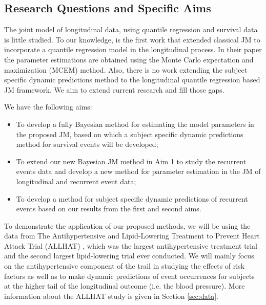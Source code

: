 \subsection{Research Questions and Specific Aims}\label{sec:aims}
The joint model of longitudinal data, using quantile regression and survival data is little studied. To our knowledge, \cite{Alessio2014qrjm} is the first work that extended classical JM to incorporate a quantile regression model in the longitudinal process. In their paper the parameter estimations are obtained using the Monte Carlo expectation and maximization (MCEM) method.  Also, there is no work extending the subject specific dynamic predictions method to the longitudinal quantile regression based JM framework. We aim to extend current research and fill those gaps.\par

We have the following aims:

\begin{itemize}
\item To develop a fully Bayesian method for estimating the model parameters in the proposed JM, based on which a subject specific dynamic predictions method for survival events will be developed; 
\item To extend our new Bayesian JM method in Aim 1 to study the recurrent events data and develop a new method for parameter estimation in the JM of longitudinal and recurrent event data;
\item To develop a method for subject specific dynamic predictions of recurrent events based on our results from the first and second aims.
\end{itemize}

To demonstrate the application of our proposed methods, we will be using the data from The Antihypertensive and Lipid-Lowering Treatment to Prevent Heart Attack Trial (ALLHAT) \citep{davis1996rationale}, which was the largest antihypertensive treatment trial and the second largest lipid-lowering trial ever conducted. We will mainly focus on the antihypertensive component of the trail in studying the effects of risk factors as well as to make dynamic predictions of event occurrences for subjects at the higher tail of the longitudinal outcome (i.e. the blood pressure). More information about the ALLHAT study is given in Section \ref{sec:data}.






